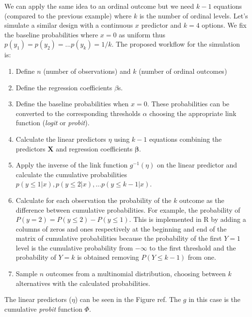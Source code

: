 \documentclass[
  man,floatsintext]{apa6}
\providecommand{\tightlist}{%
  \setlength{\itemsep}{0pt}\setlength{\parskip}{0pt}}
\begin{document}
We can apply the same idea to an ordinal outcome but we need \(k - 1\) equations (compared to the previous example) where \(k\) is the number of ordinal levels. Let's simulate a similar design with a continuous \(x\) predictor and \(k = 4\) options. We fix the baseline probabilities where \(x = 0\) as uniform thus \(p(y_1) = p(y_2) = ... p(y_k) = 1/k\). The proposed workflow for the simulation is:

\begin{enumerate}
\def\labelenumi{\arabic{enumi}.}
\tightlist
\item
  Define \(n\) (number of observations) and \(k\) (number of ordinal outcomes)
\item
  Define the regression coefficients \(\beta\)s.
\item
  Define the baseline probabilities when \(x = 0\). These probabilities can be converted to the corresponding thresholds \(\alpha\) choosing the appropriate link function (\emph{logit} or \emph{probit}).
\item
  Calculate the linear predictors \(\eta\) using \(k - 1\) equations combining the predictors \(\mathbf{X}\) and regression coefficients \(\mathbf{\beta}\).
\item
  Apply the inverse of the link function \(g^{-1}(\eta)\) on the linear predictor and calculate the cumulative probabilities \(p(y \leq 1|x), p(y \leq 2|x), ... p(y \leq k - 1|x)\).
\item
  Calculate for each observation the probability of the \(k\) outcome as the difference between cumulative probabilities. For example, the probability of \(P(y = 2) = P(y \leq 2) - P(y \leq 1)\). This is implemented in R by adding a columns of zeros and ones respectively at the beginning and end of the matrix of cumulative probabilities because the probability of the first \(Y = 1\) level is the cumulative probability from \(- \infty\) to the first threshold and the probability of \(Y = k\) is obtained removing \(P(Y \leq k - 1)\) from one.
\item
  Sample \(n\) outcomes from a multinomial distribution, choosing between \(k\) alternatives with the calculated probabilities.
\end{enumerate}

\scriptsize

\normalsize

The linear predictors (\(\eta\)) can be seen in the Figure ref. The \(g\) in this case is the cumulative \emph{probit} function \(\Phi\).

\scriptsize
\end{document}
